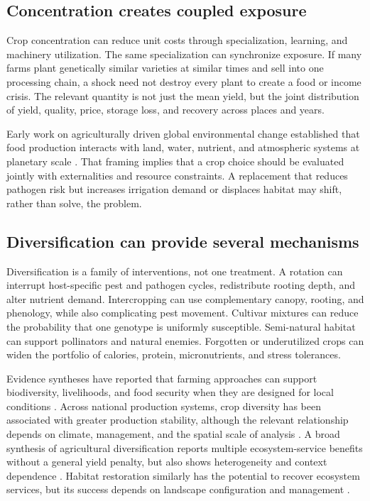 \documentclass[conference]{IEEEtran}
\begin{document}
\subsection{Concentration creates coupled exposure}
Crop concentration can reduce unit costs through specialization, learning, and machinery utilization. The same specialization can synchronize exposure. If many farms plant genetically similar varieties at similar times and sell into one processing chain, a shock need not destroy every plant to create a food or income crisis. The relevant quantity is not just the mean yield, but the joint distribution of yield, quality, price, storage loss, and recovery across places and years.

Early work on agriculturally driven global environmental change established that food production interacts with land, water, nutrient, and atmospheric systems at planetary scale \cite{tilman2001}. That framing implies that a crop choice should be evaluated jointly with externalities and resource constraints. A replacement that reduces pathogen risk but increases irrigation demand or displaces habitat may shift, rather than solve, the problem.

\subsection{Diversification can provide several mechanisms}
Diversification is a family of interventions, not one treatment. A rotation can interrupt host-specific pest and pathogen cycles, redistribute rooting depth, and alter nutrient demand. Intercropping can use complementary canopy, rooting, and phenology, while also complicating pest movement. Cultivar mixtures can reduce the probability that one genotype is uniformly susceptible. Semi-natural habitat can support pollinators and natural enemies. Forgotten or underutilized crops can widen the portfolio of calories, protein, micronutrients, and stress tolerances.

Evidence syntheses have reported that farming approaches can support biodiversity, livelihoods, and food security when they are designed for local conditions \cite{garibaldi2017}. Across national production systems, crop diversity has been associated with greater production stability, although the relevant relationship depends on climate, management, and the spatial scale of analysis \cite{renard2019}. A broad synthesis of agricultural diversification reports multiple ecosystem-service benefits without a general yield penalty, but also shows heterogeneity and context dependence \cite{tamburini2020}. Habitat restoration similarly has the potential to recover ecosystem services, but its success depends on landscape configuration and management \cite{bullock2011}.
\end{document}
